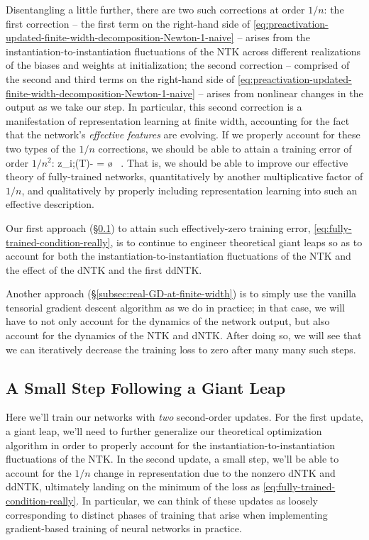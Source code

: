 Disentangling a little further, there are two such corrections at order $1/n$: the first correction -- the first term on the right-hand side of \eqref{eq:preactivation-updated-finite-width-decomposition-Newton-1-naive} -- arises from the instantiation-to-instantiation fluctuations of the NTK across different realizations of the biases and weights at initialization; the second correction -- comprised of the second and third terms on the right-hand side of \eqref{eq:preactivation-updated-finite-width-decomposition-Newton-1-naive} -- arises from nonlinear changes in the output as we take our step. In particular, this second correction is a  manifestation of representation learning at finite width, accounting for the fact that the network's \emph{effective features} are evolving. 
If we properly account for these two types of the $1/n$ corrections, we should be able to attain a training error of order $1/n^2$:
\be\label{eq:fully-trained-condition-really}
z_{i;\tra}(T)- = \o{} \, .
\ee
That is, we should be able to improve our effective theory of fully-trained networks, quantitatively by another multiplicative factor of $1/n$, and qualitatively by properly including representation learning into such an effective description.

Our first approach (\S\ref{subsec:giant-plus-small}) to attain such effectively-zero training error, \eqref{eq:fully-trained-condition-really}, is to continue to engineer theoretical giant leaps so as to account for both the instantiation-to-instantiation fluctuations of the NTK and the effect of the dNTK and the first ddNTK.

Another approach (\S\ref{subsec:real-GD-at-finite-width}) is to simply use the vanilla tensorial gradient descent algorithm as we do in practice; in that case, we will have to not only account for the dynamics of the network output, but also account for the dynamics of the NTK and dNTK. After doing so, we
will see that we can iteratively decrease the training loss to zero after many many such steps.


\subsection{A Small Step Following a Giant Leap}\label{subsec:giant-plus-small}
Here we'll train our networks with \emph{two} second-order updates. For the first update, a giant leap, we'll need to further generalize our theoretical optimization algorithm in order to properly account for the instantiation-to-instantiation fluctuations of the NTK. In the second update, a small step, we'll be able to account for the $1/n$ change in representation due to the nonzero dNTK and ddNTK, ultimately landing on the minimum of the loss as \eqref{eq:fully-trained-condition-really}. In particular, 
we can think of these updates as loosely corresponding to distinct phases of training that arise
when implementing gradient-based training of neural networks in practice. 



